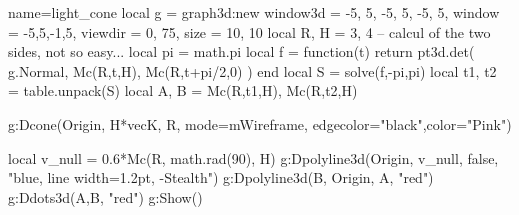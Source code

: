 \documentclass{standalone}
\begin{document}
\begin{luadraw}{name=light_cone}
    local g = graph3d:new{
        window3d = {-5, 5, -5, 5, -5, 5},
        window = {-5,5,-1,5},
        viewdir = {0, 75},
        size = {10, 10}
    }
    local R, H = 3, 4
    -- calcul of the two sides, not so easy...
    local pi = math.pi 
    local f = function(t) return pt3d.det( g.Normal, Mc(R,t,H), Mc(R,t+pi/2,0) ) end
    local S = solve(f,-pi,pi)
    local t1, t2 = table.unpack(S)
    local A, B = Mc(R,t1,H), Mc(R,t2,H)
    
    g:Dcone(Origin, H*vecK, R, {mode=mWireframe, edgecolor="black",color="Pink"})

    local v_null = 0.6*Mc(R, math.rad(90), H)
    g:Dpolyline3d({Origin, v_null}, false, "blue, line width=1.2pt, -Stealth")
    g:Dpolyline3d({B, Origin, A}, "red")
    g:Ddots3d({A,B}, "red")
    g:Show()
\end{luadraw}
\end{document}
